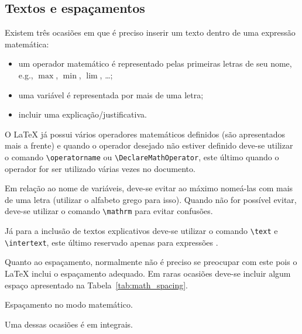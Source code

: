 \subsection{Textos e espaçamentos} \label{sss:math:textos_e_espacamentos}
Existem três ocasiões em que é preciso inserir um texto dentro de uma expressão matemática:
\begin{itemize}
  \item um operador matemático é representado pelas primeiras letras de seu nome, e.g., $\max$, $\min$, $\lim$, \ldots;
  \item uma variável é representada por mais de uma letra;
  \item incluir uma explicação/justificativa.
\end{itemize}

O LaTeX já possui vários operadores matemáticos definidos (são apresentados mais
a frente) e quando o operador desejado não estiver definido deve-se utilizar o
comando \lstinline!\operatorname! ou \lstinline!\DeclareMathOperator!, este último quando o operador
for ser utilizado várias vezes no documento. 

Em relação ao nome de variáveis, deve-se evitar ao máximo
nomeá-las com mais de uma letra (utilizar o alfabeto grego para isso). Quando
não for possível evitar, deve-se utilizar o comando \lstinline!\mathrm! para
evitar confusões. \\

Já para a inclusão de textos explicativos deve-se utilizar o comando
\lstinline!\text! e
\lstinline!\intertext!, este último reservado apenas para expressões
. \\

Quanto ao espaçamento, normalmente não é preciso se preocupar com
este pois o LaTeX inclui o espaçamento adequado. Em raras ocasiões deve-se
incluir algum espaço apresentado na Tabela~\ref{tab:math_spacing}.
\begin{table}[!htb]
  \centering
  \caption{Espaçamento no modo matemático.}
  
  \label{tab:math_spacing}
\end{table}
Uma dessas ocasiões é em integrais. \\

